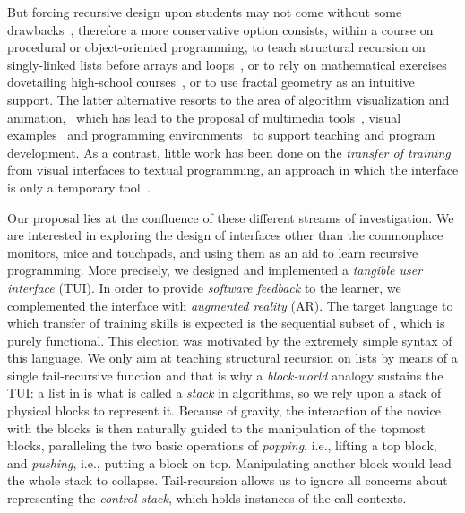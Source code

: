But forcing recursive design upon students may not come without some
drawbacks~\cite{Segal:1994,ClakMyers:1995}, therefore a more
conservative option consists, within a course on procedural or
object\hyp{}oriented programming, to teach structural recursion on
singly\hyp{}linked lists before arrays and
loops~\cite{TurbakRoydenStephanHerbst:1999}, or to rely on
mathematical exercises dovetailing high\hyp{}school
courses~\cite{RubioHernan:2007}, or to use fractal geometry as an
intuitive support. The latter alternative resorts to the area of
algorithm visualization and animation,~\cite{WilcoksSanders:1994}
which has lead to the proposal of multimedia
tools~\cite{Rosenthal:2005}, visual
examples~\cite{Stephenson:2009a,WuLeeMei:1998} and programming
environments~\cite{Kelso:2002} to support teaching and program
development. As a contrast, little work has been done on the
\emph{transfer of training} from visual interfaces to textual
programming, an approach in which the interface is only a temporary
tool~\cite{HundhausenFarleyBrown:2009}.

Our proposal lies at the confluence of these different streams of
investigation. We are interested in exploring the design of interfaces
other than the commonplace monitors, mice and touchpads, and using
them as an aid to learn recursive programming. More precisely, we
designed and implemented a \emph{tangible user interface} (TUI). In
order to provide \emph{software feedback} to the learner, we
complemented the interface with \emph{augmented reality} (AR). The
target language to which transfer of training skills is expected is
the sequential subset of \erlang, which is purely functional. This
election was motivated by the extremely simple syntax of this
language. We only aim at teaching structural recursion on lists by
means of a single tail\hyp{}recursive function and that is why a
\emph{block\hyp{}world} analogy sustains the TUI: a list in \erlang is
what is called a \emph{stack} in algorithms, so we rely upon a stack
of physical blocks to represent it. Because of gravity, the
interaction of the novice with the blocks is then naturally guided to
the manipulation of the topmost blocks, paralleling the two basic
\erlang operations of \emph{popping}, i.e., lifting a top block, and
\emph{pushing}, i.e., putting a block on top. Manipulating another
block would lead the whole stack to collapse. Tail\hyp{}recursion
allows us to ignore all concerns about representing the \emph{control
  stack}, which holds instances of the call contexts.

